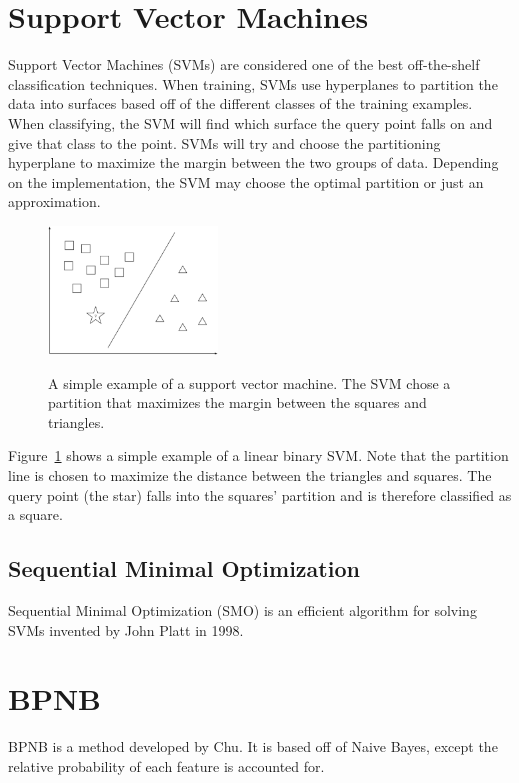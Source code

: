 \documentclass[12pt]{ucthesis}
\newcommand{\captionfonts}{\small\bf\ssp}
\begin{document}
\section{Support Vector Machines}
\label{background-classification-classifiers-svm}
Support Vector Machines (SVMs) are considered one of the best off-the-shelf classification techniques\cite{Vapnik}.
When training, SVMs use hyperplanes to partition the data into surfaces based off of the different classes of the training examples.
When classifying, the SVM will find which surface the query point falls on and give that class to the point.
SVMs will try and choose the partitioning hyperplane to maximize the margin between the two groups of data.
Depending on the implementation, the SVM may choose the optimal partition or just an approximation.

\begin{figure}
   \begin{center}
      \includegraphics[width=0.4\textwidth]{images/SVM.eps}
      \captionfonts
      \caption[Support Vector Machine]{A simple example of a support vector machine. The SVM chose a partition that maximizes the margin between the squares and triangles.}
      \label{fig:svm}
   \end{center}
\end{figure}

Figure~\ref{fig:svm} shows a simple example of a linear binary SVM.
Note that the partition line is chosen to maximize the distance between the triangles and squares.
The query point (the star) falls into the squares' partition and is therefore classified as a square.

\subsection{Sequential Minimal Optimization}
\label{background-classification-classifiers-svm-smo}
Sequential Minimal Optimization (SMO) is an efficient algorithm for solving SVMs invented by John Platt in 1998\cite{Platt}.

\section{BPNB}
\label{background-classification-classifiers-bpnb}
BPNB is a method developed by Chu\cite{bpnb}.
It is based off of Naive Bayes, except the relative probability of each feature is accounted for.
\end{document}
